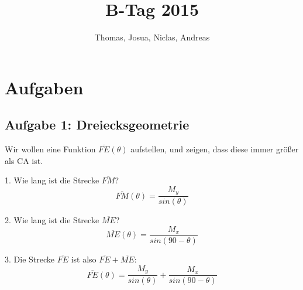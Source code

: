 \documentclass[a4paper,11pt]{article}
\title{B-Tag 2015}
\author{Thomas, Josua, Niclas, Andreas}
\begin{document}
\maketitle
\tableofcontents

\section{Aufgaben}
\subsection{Aufgabe 1: Dreiecksgeometrie}
Wir wollen eine Funktion $\overline{FE}(\theta)$ aufstellen, und zeigen, dass diese immer gr\"o\ss er als CA ist.

1. Wie lang ist die Strecke $\overline{FM}$?
\[ \overline{FM}(\theta) = \frac{M_y}{sin(\theta)} \]

2. Wie lang ist die Strecke $\overline{ME}$?
\[ \overline{ME}(\theta) = \frac{M_x}{sin(90-\theta)} \]

3. Die Strecke $\overline{FE}$ ist also $\overline{FE} + \overline{ME}$:
\[ \overline{FE}(\theta) = \frac{M_y}{sin(\theta)} + \frac{M_x}{sin(90-\theta)} \]
\end{document}
